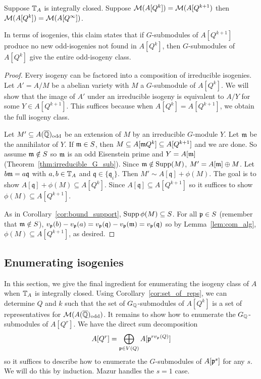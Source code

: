 \documentclass{article}
\renewcommand{\q}{\mathfrak{q}}
\newcommand{\odd}{\mathrm{odd}}
\begin{document}
\begin{corollary}
    \label{cor:set_of_reps}
    Suppose $\mathbb{T}_A$ is integrally closed. Suppose $\mathcal{M}(A[Q^k])=\mathcal{M}(A[Q^{k+1})$
    then $\mathcal{M}(A[Q^k])=\mathcal{M}(A[Q^\infty])$.

    In terms of isogenies, this claim states that if $G$-submodules of
    $A[Q^{k+1}]$ produce no new odd-isogenies not found in $A[Q^k]$, then
    $G$-submodules of $A[Q^k]$ give the entire odd-isogeny class.
\end{corollary}
\begin{proof}
    Every isogeny can be factored into a composition of irreducible isogenies.
    Let $A'=A/M$ be a abelian variety with $M$ a $G$-submodule of $A[Q^k]$. We
    will show that the image of $A'$ under an irreducible isogeny is equivalent
    to $A/Y$ for some $Y\in A[Q^{k+1}]$. This suffices because when
    $A[Q^k]=A[Q^{k+1}]$, we obtain the full isogeny class.

    Let $M'\subseteq A(\QQbar)_\odd$ be an extension of $M$ by an irreducible
    $G$-module $Y$. Let $\mathfrak{m}$ be the annihilator of $Y$. If $\mathfrak{m}\in S$, then
    $M\subseteq A[\mathfrak{m} Q^k]\subseteq A[Q^{k+1}]$ and we are done. So assume
    $\mathfrak{m}\notin S$ so $\mathfrak{m}$ is an odd Eisenstein prime and $Y=A[\mathfrak{m}]$
    (Theorem~\ref{thm:irreducible_G_sub}). Since $\mathfrak{m}\notin \operatorname{Supp}(M)$, $M' =
    A[\mathfrak{m}]\oplus M$. Let $b\m=a\q$ with $a,b\in \mathbb{T}_A$ and $\q\in \{\q_i\}$.
    Then $M'\sim A[\q] + \phi(M)$. The goal is to show $A[\q]+\phi(M)\subseteq
    A[Q^k]$. Since $A[\q]\subseteq A[Q^{k+1}]$ so it suffices to show
    $\phi(M)\subseteq A[Q^{k+1}]$.
    
    As in Corollary~\ref{cor:bound_support}, $\operatorname{Supp}\phi(M)\subseteq S$. For all
    $\mathfrak{p}\in S$ (remember that $\mathfrak{m} \notin S$), $v_\p(b)-v_\p(a) =
    v_\p(\q)-v_\p(\m)=v_\p(\q)$ so by Lemma~\ref{lem:com_alg},
    $\phi(M)\subseteq A[Q^{k+1}]$, as desired.
\end{proof}

\subsection{Enumerating isogenies}%
\label{sub:enumerating_isogenies}

In this section, we give the final ingredient for enumerating the isogeny class of $A$
when $\mathbb{T}_A$ is integrally closed. Using Corollary~\ref{cor:set_of_reps}, we
can determine $Q$ and $k$ such that the set of $G_{\mathbb{Q}}$-submodules of $A[Q^k]$
is a set of representatives for $\M(A(\QQbar)_\odd)$. It remains to show how to
enumerate the $G_{\mathbb{Q}}$-submodules of $A[Q^r]$. We have the direct sum
decomposition
\[
    A[Q^r]=\bigoplus_{\mathfrak{p}\in V(Q)} A[\mathfrak{p}^{rv_{\mathfrak{p}}(Q)}]
\]
so it suffices to describe how to enumerate the $G$-submodules of $A[\mathfrak{p}^s]$ for
any $s$. We will do this by induction. Mazur handles the $s=1$ case.
\end{document}

